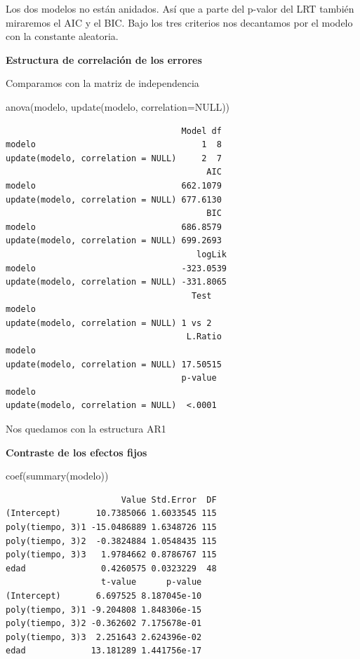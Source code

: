 \documentclass[
]{book}
\newenvironment{Shaded}{\begin{snugshade}}{\end{snugshade}}
\newcommand{\AttributeTok}[1]{\textcolor[rgb]{0.77,0.63,0.00}{#1}}
\newcommand{\ConstantTok}[1]{\textcolor[rgb]{0.00,0.00,0.00}{#1}}
\newcommand{\FunctionTok}[1]{\textcolor[rgb]{0.00,0.00,0.00}{#1}}
\newcommand{\NormalTok}[1]{#1}
\begin{document}
Los dos modelos no están anidados. Así que a parte del p-valor del LRT también miraremos el AIC y el BIC. Bajo los tres criterios nos decantamos por el modelo con la constante aleatoria.

\textbf{Estructura de correlación de los errores}

Comparamos con la matriz de independencia

\begin{Shaded}
\begin{Highlighting}[]
\FunctionTok{anova}\NormalTok{(modelo, }\FunctionTok{update}\NormalTok{(modelo, }\AttributeTok{correlation=}\ConstantTok{NULL}\NormalTok{))}
\end{Highlighting}
\end{Shaded}

\begin{verbatim}
                                   Model df
modelo                                 1  8
update(modelo, correlation = NULL)     2  7
                                        AIC
modelo                             662.1079
update(modelo, correlation = NULL) 677.6130
                                        BIC
modelo                             686.8579
update(modelo, correlation = NULL) 699.2693
                                      logLik
modelo                             -323.0539
update(modelo, correlation = NULL) -331.8065
                                     Test
modelo                                   
update(modelo, correlation = NULL) 1 vs 2
                                    L.Ratio
modelo                                     
update(modelo, correlation = NULL) 17.50515
                                   p-value
modelo                                    
update(modelo, correlation = NULL)  <.0001
\end{verbatim}

Nos quedamos con la estructura AR1

\textbf{Contraste de los efectos fijos}

\begin{Shaded}
\begin{Highlighting}[]
\FunctionTok{coef}\NormalTok{(}\FunctionTok{summary}\NormalTok{(modelo))}
\end{Highlighting}
\end{Shaded}

\begin{verbatim}
                       Value Std.Error  DF
(Intercept)       10.7385066 1.6033545 115
poly(tiempo, 3)1 -15.0486889 1.6348726 115
poly(tiempo, 3)2  -0.3824884 1.0548435 115
poly(tiempo, 3)3   1.9784662 0.8786767 115
edad               0.4260575 0.0323229  48
                   t-value      p-value
(Intercept)       6.697525 8.187045e-10
poly(tiempo, 3)1 -9.204808 1.848306e-15
poly(tiempo, 3)2 -0.362602 7.175678e-01
poly(tiempo, 3)3  2.251643 2.624396e-02
edad             13.181289 1.441756e-17
\end{verbatim}
\end{document}
